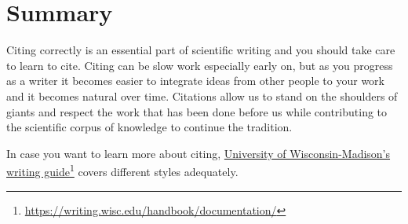 \section{Summary}

Citing correctly is an essential part of scientific writing and you should take care to learn to cite.
Citing can be slow work especially early on, but as you progress as a writer it becomes easier to integrate ideas from other people to your work and it becomes natural over time.
Citations allow us to stand on the shoulders of giants and respect the work that has been done before us while contributing to the scientific corpus of knowledge to continue the tradition.

In case you want to learn more about citing, \href{https://writing.wisc.edu/handbook/documentation/}{University of Wisconsin-Madison's writing guide}\footnote{\url{https://writing.wisc.edu/handbook/documentation/}} covers different styles adequately.
